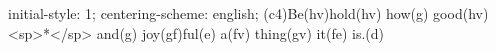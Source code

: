 initial-style: 1;
centering-scheme: english;
(c4)Be(hv)hold(hv) how(g) good(hv) <sp>*</sp> and(g) joy(gf)ful(e) a(fv) thing(gv) it(fe) is.(d)
